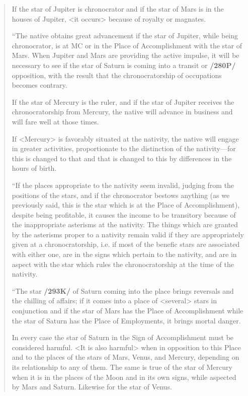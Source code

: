 \begin{quote}
If the star of Jupiter is chronocrator and if the star of Mars is in the houses of Jupiter, <it occurs> because of royalty or magnates.

“The native obtains great advancement if the star of Jupiter, while being chronocrator, is at MC or in the Place of Accomplishment with the star of Mars. When Jupiter and Mars are providing the
active impulse, it will be necessary to see if the star of Saturn is coming into a transit or \textbf{/280P/} opposition, with the result that the chronocratorship of occupations becomes contrary. 

If the star of Mercury is the ruler, and if the star of Jupiter receives the chronocratorship from Mercury, the native will advance in business and will fare well at those times. 

If <Mercury> is favorably situated at the nativity, the native will engage in greater activities, proportionate to the distinction of the nativity—for this is changed to that and that is changed to this by differences in the hours of birth.

“If the places appropriate to the nativity seem invalid, judging from the positions of the stars, and if the chronocrator bestows anything (as we previously said, this is the star which is at the Place of Accomplishment), despite being profitable, it causes the income to be transitory because of the inappropriate asterisms at the nativity. The things which are granted by the asterisms proper to a nativity remain valid if they are appropriately given at a chronocratorship, i.e. if most of the benefic stars are associated with either one, are in the signs which pertain to the nativity, and are in aspect with the star which rules the chronocratorship at the time of the nativity.

“The star \textbf{/293K/} of Saturn coming into the place brings reversals and the chilling of affairs; if it comes into a place of <several> stars in conjunction and if the star of Mars has the Place of Accomplishment while the star of Saturn has the Place of Employments, it brings mortal danger. 

In every case the star of Saturn in the Sign of Accomplishment must be considered harmful. <It is also harmful> when in opposition to this Place and to the places of the stars of Mars, Venus, and Mercury, depending on its relationship to any of them. The same is true of the star of Mercury when it is in the places of the Moon and in its own signs, while aspected by Mars and Saturn. Likewise for the star of Venus. 


\end{quote}
